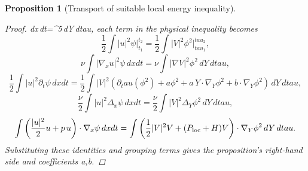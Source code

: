 \documentclass[11pt]{amsart}
\def\({}%
\def\){}%
\def\tilde#1{#1}%
\def\tau{tau}%
\theoremstyle{plain}
\newtheorem{proposition}[theorem]{Proposition}
\theoremstyle{definition}
\theoremstyle{remark}
\begin{document}
\begin{proposition}[Transport of suitable local energy inequality]
\begin{proof}
\(dx\,dt=\Lambda^{5}\,dY\,d\tau\), each term in the physical inequality becomes
\[
\frac12\int |u|^2\psi\big|_{t_1}^{t_2}
=\frac12\int |V|^2\phi^2\big|_{\tau_1}^{\tau_2},
\]
\[
\nu\int |\nabla_xu|^2\psi\,dxdt
=\nu\int |\nabla V|^2\phi^2\,dY\,d\tau,
\]
\[
\frac12\int |u|^2\partial_t\psi\,dxdt
=\frac12\int |V|^2\left(\partial_\tau(\phi^2)+\tilde a\phi^2+\tilde a\,Y\cdot\nabla_Y\phi^2+\tilde b\cdot\nabla_Y\phi^2\right)\,dY\,d\tau,
\]
\[
\frac{\nu}{2}\int |u|^2\Delta_x\psi\,dxdt
=\frac{\nu}{2}\int |V|^2\Delta_Y\phi^2\,dY\,d\tau,
\]
\[
\int\left(\frac{|u|^2}{2}u+p\,u\right)\cdot\nabla_x\psi\,dxdt
=\int\left(\frac12|V|^2V+(P_{\rm loc}+H)V\right)\cdot\nabla_Y\phi^2\,dY\,d\tau.
\]
Substituting these identities and grouping terms gives the proposition's right-hand
side and coefficients \(\tilde a,\tilde b\).
\end{proof}
\end{proposition}
\end{document}
